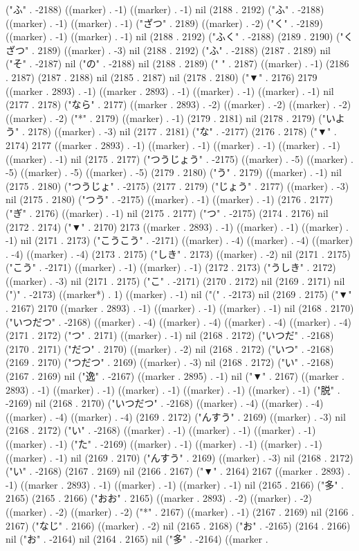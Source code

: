 ("ふ" . -2188) ((marker) . -1) ((marker) . -1) nil (2188 . 2192) ("ふ" . -2188) ((marker) . -1) ((marker) . -1) ("ざつ" . 2189) ((marker) . -2) ("く" . -2189) ((marker) . -1) ((marker) . -1) nil (2188 . 2192) ("ふく" . -2188) (2189 . 2190) ("くざつ" . 2189) ((marker) . -3) nil (2188 . 2192) ("ふ" . -2188) (2187 . 2189) nil ("そ" . -2187) nil ("の" . -2188) nil (2188 . 2189) (" " . 2187) ((marker) . -1) (2186 . 2187) (2187 . 2188) nil (2185 . 2187) nil (2178 . 2180) ("▼" . 2176) 2179 ((marker . 2893) . -1) ((marker . 2893) . -1) ((marker) . -1) ((marker) . -1) nil (2177 . 2178) ("なら" . 2177) ((marker . 2893) . -2) ((marker) . -2) ((marker) . -2) ((marker) . -2) ("*" . 2179) ((marker) . -1) (2179 . 2181) nil (2178 . 2179) ("いよう" . 2178) ((marker) . -3) nil (2177 . 2181) ("な" . -2177) (2176 . 2178) ("▼" . 2174) 2177 ((marker . 2893) . -1) ((marker) . -1) ((marker) . -1) ((marker) . -1) ((marker) . -1) nil (2175 . 2177) ("つうじょう" . -2175) ((marker) . -5) ((marker) . -5) ((marker) . -5) ((marker) . -5) (2179 . 2180) ("う" . 2179) ((marker) . -1) nil (2175 . 2180) ("つうじょ" . -2175) (2177 . 2179) ("じょう" . 2177) ((marker) . -3) nil (2175 . 2180) ("つう" . -2175) ((marker) . -1) ((marker) . -1) (2176 . 2177) ("ぎ" . 2176) ((marker) . -1) nil (2175 . 2177) ("つ" . -2175) (2174 . 2176) nil (2172 . 2174) ("▼" . 2170) 2173 ((marker . 2893) . -1) ((marker) . -1) ((marker) . -1) nil (2171 . 2173) ("こうこう" . -2171) ((marker) . -4) ((marker) . -4) ((marker) . -4) ((marker) . -4) (2173 . 2175) ("しき" . 2173) ((marker) . -2) nil (2171 . 2175) ("こう" . -2171) ((marker) . -1) ((marker) . -1) (2172 . 2173) ("うしき" . 2172) ((marker) . -3) nil (2171 . 2175) ("こ" . -2171) (2170 . 2172) nil (2169 . 2171) nil (")" . -2173) ((marker*) . 1) ((marker) . -1) nil ("(" . -2173) nil (2169 . 2175) ("▼" . 2167) 2170 ((marker . 2893) . -1) ((marker) . -1) ((marker) . -1) nil (2168 . 2170) ("いつだつ" . -2168) ((marker) . -4) ((marker) . -4) ((marker) . -4) ((marker) . -4) (2171 . 2172) ("つ" . 2171) ((marker) . -1) nil (2168 . 2172) ("いつだ" . -2168) (2170 . 2171) ("だつ" . 2170) ((marker) . -2) nil (2168 . 2172) ("いつ" . -2168) (2169 . 2170) ("つだつ" . 2169) ((marker) . -3) nil (2168 . 2172) ("い" . -2168) (2167 . 2169) nil ("逸" . -2167) ((marker . 2895) . -1) nil ("▼" . 2167) ((marker . 2893) . -1) ((marker) . -1) ((marker) . -1) ((marker) . -1) ((marker) . -1) ("脱" . -2169) nil (2168 . 2170) ("いつだつ" . -2168) ((marker) . -4) ((marker) . -4) ((marker) . -4) ((marker) . -4) (2169 . 2172) ("んすう" . 2169) ((marker) . -3) nil (2168 . 2172) ("い" . -2168) ((marker) . -1) ((marker) . -1) ((marker) . -1) ((marker) . -1) ("た" . -2169) ((marker) . -1) ((marker) . -1) ((marker) . -1) ((marker) . -1) nil (2169 . 2170) ("んすう" . 2169) ((marker) . -3) nil (2168 . 2172) ("い" . -2168) (2167 . 2169) nil (2166 . 2167) ("▼" . 2164) 2167 ((marker . 2893) . -1) ((marker . 2893) . -1) ((marker) . -1) ((marker) . -1) nil (2165 . 2166) ("多" . 2165) (2165 . 2166) ("おお" . 2165) ((marker . 2893) . -2) ((marker) . -2) ((marker) . -2) ((marker) . -2) ("*" . 2167) ((marker) . -1) (2167 . 2169) nil (2166 . 2167) ("なじ" . 2166) ((marker) . -2) nil (2165 . 2168) ("お" . -2165) (2164 . 2166) nil ("お" . -2164) nil (2164 . 2165) nil ("多" . -2164) ((marker . 